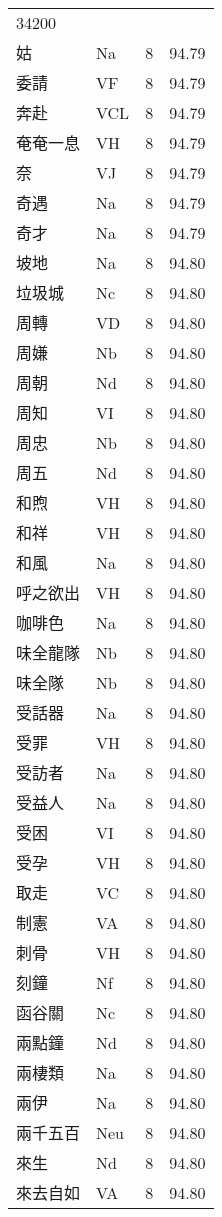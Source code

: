 \documentclass[twocolumn]{book}
\begin{document}
\begin{supertabular}{llrr}
34200\\
姑 & Na & 8 &  94.79\\
委請 & VF & 8 &  94.79\\
奔赴 & VCL & 8 &  94.79\\
奄奄一息 & VH & 8 &  94.79\\
奈 & VJ & 8 &  94.79\\
奇遇 & Na & 8 &  94.79\\
奇才 & Na & 8 &  94.79\\
坡地 & Na & 8 &  94.80\\
垃圾城 & Nc & 8 &  94.80\\
周轉 & VD & 8 &  94.80\\
周嫌 & Nb & 8 &  94.80\\
周朝 & Nd & 8 &  94.80\\
周知 & VI & 8 &  94.80\\
周忠 & Nb & 8 &  94.80\\
周五 & Nd & 8 &  94.80\\
和煦 & VH & 8 &  94.80\\
和祥 & VH & 8 &  94.80\\
和風 & Na & 8 &  94.80\\
呼之欲出 & VH & 8 &  94.80\\
咖啡色 & Na & 8 &  94.80\\
味全龍隊 & Nb & 8 &  94.80\\
味全隊 & Nb & 8 &  94.80\\
受話器 & Na & 8 &  94.80\\
受罪 & VH & 8 &  94.80\\
受訪者 & Na & 8 &  94.80\\
受益人 & Na & 8 &  94.80\\
受困 & VI & 8 &  94.80\\
受孕 & VH & 8 &  94.80\\
取走 & VC & 8 &  94.80\\
制憲 & VA & 8 &  94.80\\
刺骨 & VH & 8 &  94.80\\
刻鐘 & Nf & 8 &  94.80\\
函谷關 & Nc & 8 &  94.80\\
兩點鐘 & Nd & 8 &  94.80\\
兩棲類 & Na & 8 &  94.80\\
兩伊 & Na & 8 &  94.80\\
兩千五百 & Neu & 8 &  94.80\\
來生 & Nd & 8 &  94.80\\
來去自如 & VA & 8 &  94.80\\

\end{supertabular}
\end{document}
